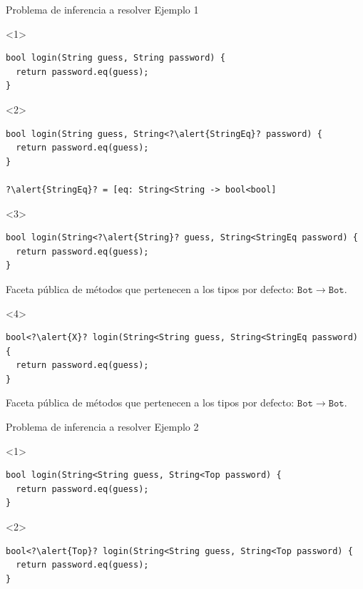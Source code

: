\documentclass[aspectratio=169,10pt]{beamer}
\begin{document}
\begin{frame}[fragile]{Problema de inferencia a resolver}
	Ejemplo 1 \\
	\vspace{1cm}
	\begin{onlyenv}
\begin{lstlisting}[escapechar=?,basicstyle=\fontsize{9}{9}\ttfamily]
bool login(String guess, String password) {
  return password.eq(guess);
}
\end{lstlisting}
	\end{onlyenv}
	\begin{onlyenv}
\begin{lstlisting}[escapechar=?,basicstyle=\fontsize{9}{9}\ttfamily]
bool login(String guess, String<?\alert{StringEq}? password) {
  return password.eq(guess);
}

?\alert{StringEq}? = [eq: String<String -> bool<bool]
\end{lstlisting}
	\end{onlyenv}
\begin{onlyenv}<3>
\begin{lstlisting}[escapechar=?,basicstyle=\fontsize{9}{9}\ttfamily]
bool login(String<?\alert{String}? guess, String<StringEq password) {
  return password.eq(guess);
}
\end{lstlisting}
Faceta pública de métodos que pertenecen a los tipos por defecto: $\mathtt{Bot\rightarrow Bot}$.
	\end{onlyenv}
	\begin{onlyenv}
\begin{lstlisting}[escapechar=?,basicstyle=\fontsize{9}{9}\ttfamily]
bool<?\alert{X}? login(String<String guess, String<StringEq password) {
  return password.eq(guess);
}
\end{lstlisting}
Faceta pública de métodos que pertenecen a los tipos por defecto: $\mathtt{Bot\rightarrow Bot}$.
	\end{onlyenv}
\end{frame}

\begin{frame}[fragile]{Problema de inferencia a resolver}
	Ejemplo 2 \\
	\vspace{1cm}
	\begin{onlyenv}
\begin{lstlisting}[basicstyle=\fontsize{9}{9}\ttfamily]
bool login(String<String guess, String<Top password) {
  return password.eq(guess);
}
\end{lstlisting}
	\end{onlyenv}
	\begin{onlyenv}
\begin{lstlisting}[escapechar=?,basicstyle=\fontsize{9}{9}\ttfamily]
bool<?\alert{Top}? login(String<String guess, String<Top password) {
  return password.eq(guess);
}
\end{lstlisting}
	\end{onlyenv}
\end{frame}
\end{document}
